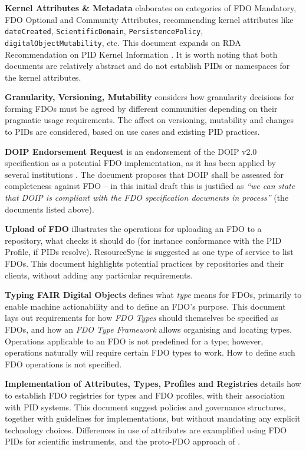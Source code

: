 \textbf{Kernel Attributes \& Metadata} \cite{fdo-KernelAttributes} elaborates on categories of FDO Mandatory, FDO Optional and Community Attributes, recommending kernel attributes like \texttt{dateCreated}, \texttt{ScientificDomain}, \texttt{PersistencePolicy}, \texttt{digitalObjectMutability}, etc. This document expands on RDA Recommendation on PID Kernel Information \cite{weigelRDARecommendationPID2018}. It is worth noting that both documents are relatively abstract and do not establish PIDs or namespaces for the kernel attributes.

\textbf{Granularity, Versioning, Mutability} \cite{fdo-Granularity} considers how granularity decisions for forming FDOs must be agreed by different communities depending on their pragmatic usage requirements. The affect on versioning, mutability and changes to PIDs are considered, based on use cases and existing PID practices.

\textbf{DOIP Endorsement Request} \cite{fdo-DOIPEndorsement} is an endorsement of the DOIP v2.0 \cite{DONA 2018} specification as a potential FDO implementation, as it has been applied by several institutions \cite{wittenburgFAIRDigitalObject2022b}. The document proposes that DOIP shall be assessed for completeness against FDO -- in this initial draft this is justified as \emph{``we can state that DOIP is compliant with the FDO specification documents in process''} (the documents listed above).

\textbf{Upload of FDO} \cite{fdo-FDO-Upload} illustrates the operations for uploading an FDO to a repository, what checks it should do (for instance conformance with the PID Profile, if PIDs resolve). ResourceSync \cite{ResourceSyncFrameworkSpecification} is suggested as one type of service to list FDOs. This document highlights potential practices by repositories and their clients, without adding any particular requirements.

\textbf{Typing FAIR Digital Objects} \cite{fdo-TypingFDOs} defines what \emph{type} means for FDOs, primarily to enable machine actionability and to define an FDO's purpose. This document lays out requirements for how \emph{FDO Types} should themselves be specified as FDOs, and how an \emph{FDO Type Framework} allows organising and locating types. Operations applicable to an FDO is not predefined for a type; however, operations naturally will require certain FDO types to work. How to define such FDO operations is not specified.

\textbf{Implementation of Attributes, Types, Profiles and Registries} \cite{fdo-ImplAttributesTypesProfiles} details how to establish FDO registries for types and FDO profiles, with their association with PID systems. This document suggest policies and governance structures, together with guidelines for implementations, but without mandating any explicit technology choices. Differences in use of attributes are examplified using FDO PIDs for scientific instruments, and the proto-FDO approach of  \cite{schwardmannTwoExamplesHow2022}.

